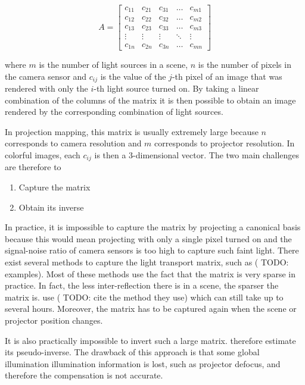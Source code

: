 \begin{equation}
    \label{eq:lt_matrix}
    A = \begin{bmatrix}
        c_{11} & c_{21} & c_{31} & \dots & c_{m1} \\
        c_{12} & c_{22} & c_{32} & \dots & c_{m2} \\
        c_{13} & c_{23} & c_{33} & \dots & c_{m3} \\
        \vdots & \vdots & \vdots & \ddots & \vdots \\
        c_{1n} & c_{2n} & c_{3n} & \dots & c_{mn}
    \end{bmatrix}
\end{equation}

where \(m\) is the number of light sources in a scene, \(n\) is the number of pixels in the camera sensor and \(c_{ij}\) is the value of the \(j\)-th pixel of an image that was rendered with only the \(i\)-th light source turned on. By taking a linear combination of the columns of the matrix it is then possible to obtain an image rendered by the corresponding combination of light sources.

In projection mapping, this matrix is usually extremely large because \(n\) corresponds to camera resolution and \(m\) corresponds to projector resolution. In colorful images, each \(c_{ij}\) is then a 3-dimensional vector. The two main challenges are therefore to

\begin{enumerate}
    \item Capture the matrix
    \item Obtain its inverse
\end{enumerate}

In practice, it is impossible to capture the matrix by projecting a canonical basis because this would mean projecting with only a single pixel turned on and the signal-noise ratio of camera sensors is too high to capture such faint light. There exist several methods to capture the light transport matrix, such as ({\color{red} TODO: examples}). Most of these methods use the fact that the matrix is very sparse in practice. In fact, the less inter-reflection there is in a scene, the sparser the matrix is. \citet{Wetzstein2007} use ({\color{red} TODO: cite the method they use}) which can still take up to several hours. Moreover, the matrix has to be captured again when the scene or projector position changes.

It is also practically impossible to invert such a large matrix. \citet{Wetzstein2007} therefore estimate its pseudo-inverse. The drawback of this approach is that some global illumination illumination information is lost, such as projector defocus, and therefore the compensation is not accurate.

